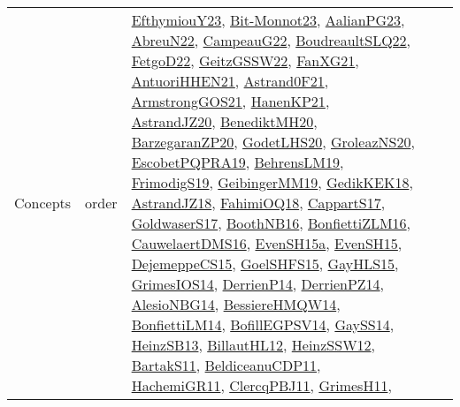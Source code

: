 {\begin{longtable}{lp{3cm}>{\raggedright}p{6cm}>{\raggedright}p{6cm}p{8cm}}
Concepts & order & \href{papers/EfthymiouY23.pdf}{EfthymiouY23}\cite{EfthymiouY23}, \href{papers/Bit-Monnot23.pdf}{Bit-Monnot23}\cite{Bit-Monnot23}, \href{papers/AalianPG23.pdf}{AalianPG23}\cite{AalianPG23}, \href{articles/AbreuN22.pdf}{AbreuN22}\cite{AbreuN22}, \href{articles/CampeauG22.pdf}{CampeauG22}\cite{CampeauG22}, \href{papers/BoudreaultSLQ22.pdf}{BoudreaultSLQ22}\cite{BoudreaultSLQ22}, \href{articles/FetgoD22.pdf}{FetgoD22}\cite{FetgoD22}, \href{papers/GeitzGSSW22.pdf}{GeitzGSSW22}\cite{GeitzGSSW22}, \href{articles/FanXG21.pdf}{FanXG21}\cite{FanXG21}, \href{papers/AntuoriHHEN21.pdf}{AntuoriHHEN21}\cite{AntuoriHHEN21}, \href{papers/Astrand0F21.pdf}{Astrand0F21}\cite{Astrand0F21}, \href{papers/ArmstrongGOS21.pdf}{ArmstrongGOS21}\cite{ArmstrongGOS21}, \href{papers/HanenKP21.pdf}{HanenKP21}\cite{HanenKP21}, \href{articles/AstrandJZ20.pdf}{AstrandJZ20}\cite{AstrandJZ20}, \href{articles/BenediktMH20.pdf}{BenediktMH20}\cite{BenediktMH20}, \href{papers/BarzegaranZP20.pdf}{BarzegaranZP20}\cite{BarzegaranZP20}, \href{papers/GodetLHS20.pdf}{GodetLHS20}\cite{GodetLHS20}, \href{papers/GroleazNS20.pdf}{GroleazNS20}\cite{GroleazNS20}, \href{articles/EscobetPQPRA19.pdf}{EscobetPQPRA19}\cite{EscobetPQPRA19}, \href{papers/BehrensLM19.pdf}{BehrensLM19}\cite{BehrensLM19}, \href{papers/FrimodigS19.pdf}{FrimodigS19}\cite{FrimodigS19}, \href{papers/GeibingerMM19.pdf}{GeibingerMM19}\cite{GeibingerMM19}, \href{articles/GedikKEK18.pdf}{GedikKEK18}\cite{GedikKEK18}, \href{papers/AstrandJZ18.pdf}{AstrandJZ18}\cite{AstrandJZ18}, \href{articles/FahimiOQ18.pdf}{FahimiOQ18}\cite{FahimiOQ18}, \href{papers/CappartS17.pdf}{CappartS17}\cite{CappartS17}, \href{papers/GoldwaserS17.pdf}{GoldwaserS17}\cite{GoldwaserS17}, \href{papers/BoothNB16.pdf}{BoothNB16}\cite{BoothNB16}, \href{papers/BonfiettiZLM16.pdf}{BonfiettiZLM16}\cite{BonfiettiZLM16}, \href{papers/CauwelaertDMS16.pdf}{CauwelaertDMS16}\cite{CauwelaertDMS16}, \href{articles/EvenSH15a.pdf}{EvenSH15a}\cite{EvenSH15a}, \href{papers/EvenSH15.pdf}{EvenSH15}\cite{EvenSH15}, \href{papers/DejemeppeCS15.pdf}{DejemeppeCS15}\cite{DejemeppeCS15}, \href{articles/GoelSHFS15.pdf}{GoelSHFS15}\cite{GoelSHFS15}, \href{papers/GayHLS15.pdf}{GayHLS15}\cite{GayHLS15}, \href{articles/GrimesIOS14.pdf}{GrimesIOS14}\cite{GrimesIOS14}, \href{papers/DerrienP14.pdf}{DerrienP14}\cite{DerrienP14}, \href{papers/DerrienPZ14.pdf}{DerrienPZ14}\cite{DerrienPZ14}, \href{papers/AlesioNBG14.pdf}{AlesioNBG14}\cite{AlesioNBG14}, \href{papers/BessiereHMQW14.pdf}{BessiereHMQW14}\cite{BessiereHMQW14}, \href{papers/BonfiettiLM14.pdf}{BonfiettiLM14}\cite{BonfiettiLM14}, \href{papers/BofillEGPSV14.pdf}{BofillEGPSV14}\cite{BofillEGPSV14}, \href{papers/GaySS14.pdf}{GaySS14}\cite{GaySS14}, \href{articles/HeinzSB13.pdf}{HeinzSB13}\cite{HeinzSB13}, \href{papers/BillautHL12.pdf}{BillautHL12}\cite{BillautHL12}, \href{articles/HeinzSSW12.pdf}{HeinzSSW12}\cite{HeinzSSW12}, \href{articles/BartakS11.pdf}{BartakS11}\cite{BartakS11}, \href{articles/BeldiceanuCDP11.pdf}{BeldiceanuCDP11}\cite{BeldiceanuCDP11}, \href{articles/HachemiGR11.pdf}{HachemiGR11}\cite{HachemiGR11}, \href{papers/ClercqPBJ11.pdf}{ClercqPBJ11}\cite{ClercqPBJ11}, \href{papers/GrimesH11.pdf}{GrimesH11}\cite{GrimesH11}, 
\end{longtable}}
